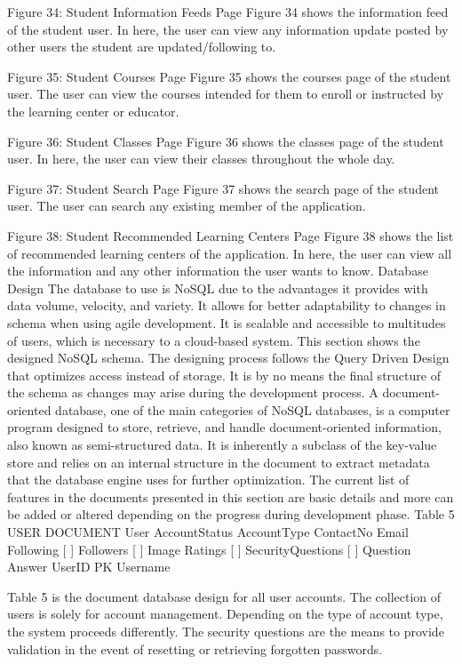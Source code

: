 Figure 34: Student Information Feeds Page
Figure 34 shows the information feed of the student user. In here, the user can view any information update posted by other users the student are updated/following to.    
   
Figure 35: Student Courses Page
Figure 35 shows the courses page of the student user. The user can view the courses intended for them to enroll or instructed by the learning center or educator.     
 
Figure 36: Student Classes Page
Figure 36 shows the classes page of the student user. In here, the user can view their classes throughout the whole day.  


 
Figure 37: Student Search Page
Figure 37 shows the search page of the student user. The user can search any existing member of the application.   
 
Figure 38: Student Recommended Learning Centers Page
Figure 38 shows the list of recommended learning centers of the application. In here, the user can view all the information and any other information the user wants to know.    
Database Design
The database to use is NoSQL due to the advantages it provides with data volume, velocity, and variety. It allows for better adaptability to changes in schema when using agile development. It is scalable and accessible to multitudes of users, which is necessary to a cloud-based system.
This section shows the designed NoSQL schema. The designing process follows the Query Driven Design that optimizes access instead of storage. It is by no means the final structure of the schema as changes may arise during the development process. 
A document-oriented database, one of the main categories of NoSQL databases, is a computer program designed to store, retrieve, and handle document-oriented information, also known as semi-structured data. It is inherently a subclass of the key-value store and relies on an internal structure in the document to extract metadata that the database engine uses for further optimization. The current list of features in the documents presented in this section are basic details and more can be added or altered depending on the progress during development phase.
Table 5
USER DOCUMENT
User
 	AccountStatus
 	AccountType
 	ContactNo
 	Email
 	Following [ ]
 	Followers [ ]
 	Image
 	Ratings [ ]
 	SecurityQuestions [ ] { }
 	 	Question
 		Answer
 	UserID
PK	Username


Table 5 is the document database design for all user accounts. The collection of users is solely for account management. Depending on the type of account type, the system proceeds differently. The security questions are the means to provide validation in the event of resetting or retrieving forgotten passwords.

